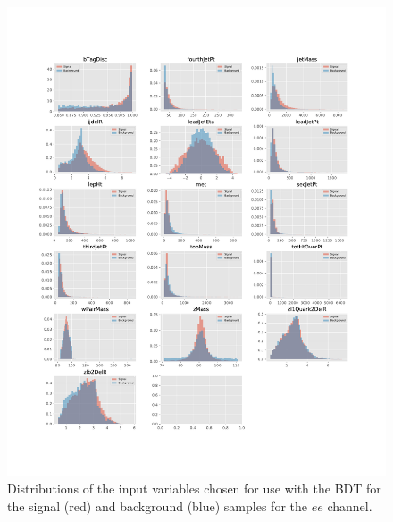 \begin{figure}[htbp]
\centering
\vspace*{-3.25cm}\hspace*{-2.3cm}\includegraphics[width=1.27\textwidth]{figs/background-estimation/plots/vars_ee.pdf}
\vspace*{-1cm}\caption{
Distributions of the input variables chosen for use with the BDT for the signal (red) and background (blue) samples for the $ee$ channel.}
\label{fig:inputFeaturesDistributions_ee}
\end{figure}

